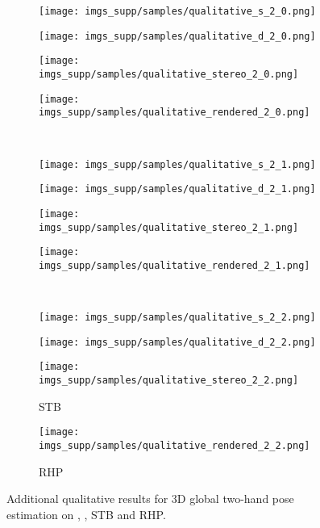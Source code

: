 \documentclass[10pt,twocolumn,letterpaper]{article}
\begin{document}
\appendix
\renewcommand\thefigure{\thesection\arabic{figure}}
\setcounter{figure}{1}
\begin{figure*}[h]
  \begin{subfigure}[t]{0.29283019\linewidth}
    \texttt{[image: imgs\_supp/samples/qualitative\_s\_2\_0.png]}
  \end{subfigure}
  \begin{subfigure}[t]{0.29283019\linewidth}
    \texttt{[image: imgs\_supp/samples/qualitative\_d\_2\_0.png]}
  \end{subfigure}
  \begin{subfigure}[t]{0.21962264\linewidth}
    \texttt{[image: imgs\_supp/samples/qualitative\_stereo\_2\_0.png]}
  \end{subfigure}
  \begin{subfigure}[t]{0.16471698\linewidth}
    \texttt{[image: imgs\_supp/samples/qualitative\_rendered\_2\_0.png]}
  \end{subfigure}\\
  \begin{subfigure}[t]{0.29283019\linewidth}
    \texttt{[image: imgs\_supp/samples/qualitative\_s\_2\_1.png]}
  \end{subfigure}
  \begin{subfigure}[t]{0.29283019\linewidth}
    \texttt{[image: imgs\_supp/samples/qualitative\_d\_2\_1.png]}
  \end{subfigure}
  \begin{subfigure}[t]{0.21962264\linewidth}
    \texttt{[image: imgs\_supp/samples/qualitative\_stereo\_2\_1.png]}
  \end{subfigure}
  \begin{subfigure}[t]{0.16471698\linewidth}
    \texttt{[image: imgs\_supp/samples/qualitative\_rendered\_2\_1.png]}
  \end{subfigure}\\
  \begin{subfigure}[t]{0.29283019\linewidth}
    \texttt{[image: imgs\_supp/samples/qualitative\_s\_2\_2.png]}
    \caption{}\label{fig:qualitative_ego_s}
  \end{subfigure}
  \begin{subfigure}[t]{0.29283019\linewidth}
    \texttt{[image: imgs\_supp/samples/qualitative\_d\_2\_2.png]}
    \caption{}\label{fig:qualitative_ego_d}
  \end{subfigure}
  \begin{subfigure}[t]{0.21962264\linewidth}
    \texttt{[image: imgs\_supp/samples/qualitative\_stereo\_2\_2.png]}
    \caption{STB }\label{fig:qualitative_stb}
  \end{subfigure}
  \begin{subfigure}[t]{0.16471698\linewidth}
    \texttt{[image: imgs\_supp/samples/qualitative\_rendered\_2\_2.png]}
    \caption{RHP }\label{fig:qualitative_rhp}
  \end{subfigure}
  \vspace{0.4cm}
  \caption{Additional qualitative results for 3D global two-hand pose estimation on , , STB and RHP. }
  \label{fig:qualitative_results2}
\end{figure*}
\end{document}
